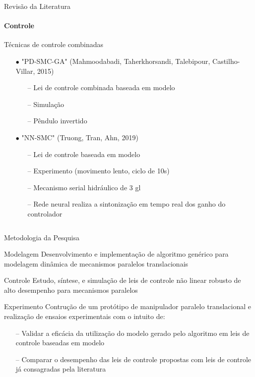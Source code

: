 \documentclass[25pt,landscape]{beamer}
\begin{document}
\begin{frame}{Revisão da Literatura}
    \framesubtitle{Controle}
    \begin{block}{Técnicas de controle combinadas}
        \begin{itemize}
            \item[$\bullet$] "PD-SMC-GA" (Mahmoodabadi, Taherkhorsandi, Talebipour, Castilho-Villar, 2015)
            \begin{itemize}
            	\item[--] Lei de controle combinada baseada em modelo
            	\item[--] Simulação
            	\item[--] Pêndulo invertido
            \end{itemize}
        \item[$\bullet$] "NN-SMC" (Truong, Tran, Ahn, 2019)
            \begin{itemize}
            	\item[--] Lei de controle baseada em modelo
            	\item[--] Experimento (movimento lento, ciclo de 10s)
            	\item[--] Mecanismo serial hidráulico de 3 gl
            	\item[--] Rede neural realiza a sintonização em tempo real dos ganho do controlador
            \end{itemize}
        \end{itemize}
    \end{block}
    $$ $$
    $$ $$
\end{frame}

\begin{frame}{Metodologia da Pesquisa}
    \begin{block}{Modelagem}
        Desenvolvimento e implementação de algoritmo genérico para modelagem dinâmica de mecanismos paralelos translacionais
    \end{block}
    \begin{block}{Controle}
        Estudo, síntese, e simulação de leis de controle não linear robusto de alto desempenho para mecanismos paralelos 
    \end{block}
    \begin{block}{Experimento}
		Contrução de um protótipo de manipulador paralelo translacional e realização de ensaios experimentais com o intuito de:
		\begin{itemize}
			\item[--] Validar a eficácia da utilização do modelo gerado pelo algoritmo em leis de controle baseadas em modelo
			\item[--] Comparar o desempenho das leis de controle propostas com leis de controle já consagradas pela literatura
		\end{itemize}
    \end{block}
\end{frame}
\end{document}
